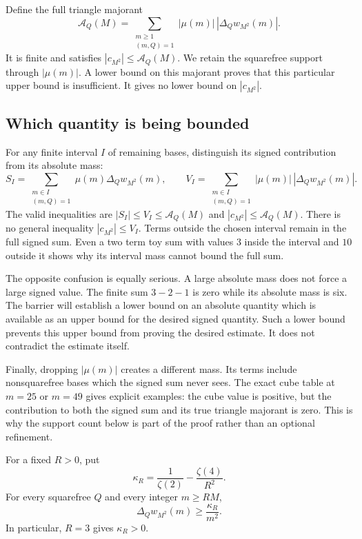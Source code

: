 Define the full triangle majorant
\begin{equation}\label{rh:majorant}
\mathcal A_Q(M)=\sum_{\substack{m\ge1\\(m,Q)=1}}
|\mu(m)|\,|\Delta_Qw_{M^2}(m)|.
\end{equation}
It is finite and satisfies \(|c_{M^2}|\le\mathcal A_Q(M)\). We retain the squarefree support through \(|\mu(m)|\). A lower bound on this majorant proves that this particular upper bound is insufficient. It gives no lower bound on \(|c_{M^2}|\).

\subsection{Which quantity is being bounded}

For any finite interval \(I\) of remaining bases, distinguish its signed contribution from its absolute mass:
\[
S_I=\sum_{\substack{m\in I\\(m,Q)=1}}\mu(m)\Delta_Qw_{M^2}(m),
\qquad
V_I=\sum_{\substack{m\in I\\(m,Q)=1}}
|\mu(m)|\,|\Delta_Qw_{M^2}(m)|.
\]
The valid inequalities are \(|S_I|\le V_I\le\mathcal A_Q(M)\) and \(|c_{M^2}|\le\mathcal A_Q(M)\). There is no general inequality \(|c_{M^2}|\le V_I\). Terms outside the chosen interval remain in the full signed sum. Even a two term toy sum with values \(3\) inside the interval and \(10\) outside it shows why its interval mass cannot bound the full sum.

The opposite confusion is equally serious. A large absolute mass does not force a large signed value. The finite sum \(3-2-1\) is zero while its absolute mass is six. The barrier will establish a lower bound on an absolute quantity which is available as an upper bound for the desired signed quantity. Such a lower bound prevents this upper bound from proving the desired estimate. It does not contradict the estimate itself.

Finally, dropping \(|\mu(m)|\) creates a different mass. Its terms include nonsquarefree bases which the signed sum never sees. The exact cube table at \(m=25\) or \(m=49\) gives explicit examples: the cube value is positive, but the contribution to both the signed sum and its true triangle majorant is zero. This is why the support count below is part of the proof rather than an optional refinement.

\begin{lemma}\label{rh:positive}
For a fixed \(R>0\), put
\begin{equation}\label{rh:cr}
\kappa_R=\frac1{\zeta(2)}-\frac{\zeta(4)}{R^2}.
\end{equation}
For every squarefree \(Q\) and every integer \(m\ge RM\),
\begin{equation}\label{rh:positivebound}
\Delta_Qw_{M^2}(m)\ge\frac{\kappa_R}{m^2}.
\end{equation}
In particular, \(R=3\) gives \(\kappa_R>0\).
\end{lemma}

